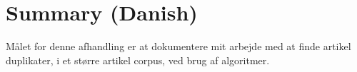 \chapter{Summary (Danish)}
\begin{otherlanguage}{danish}

Målet for denne afhandling er at dokumentere mit arbejde med at finde artikel duplikater, i et større artikel corpus, ved brug af algoritmer.

\end{otherlanguage}
